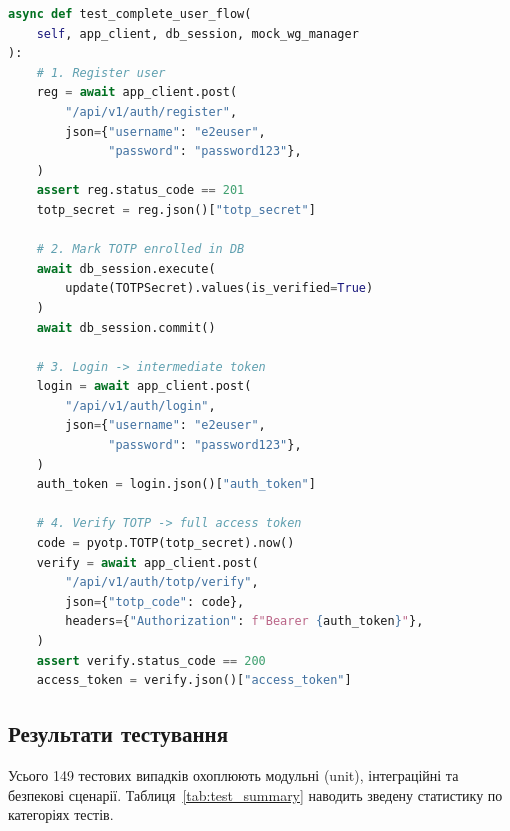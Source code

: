 \begin{lstlisting}[style=mystyle, language=Python,
  caption={Фрагмент наскрізного інтеграційного тесту},
  label={lst:e2e_test}]
async def test_complete_user_flow(
    self, app_client, db_session, mock_wg_manager
):
    # 1. Register user
    reg = await app_client.post(
        "/api/v1/auth/register",
        json={"username": "e2euser",
              "password": "password123"},
    )
    assert reg.status_code == 201
    totp_secret = reg.json()["totp_secret"]

    # 2. Mark TOTP enrolled in DB
    await db_session.execute(
        update(TOTPSecret).values(is_verified=True)
    )
    await db_session.commit()

    # 3. Login -> intermediate token
    login = await app_client.post(
        "/api/v1/auth/login",
        json={"username": "e2euser",
              "password": "password123"},
    )
    auth_token = login.json()["auth_token"]

    # 4. Verify TOTP -> full access token
    code = pyotp.TOTP(totp_secret).now()
    verify = await app_client.post(
        "/api/v1/auth/totp/verify",
        json={"totp_code": code},
        headers={"Authorization": f"Bearer {auth_token}"},
    )
    assert verify.status_code == 200
    access_token = verify.json()["access_token"]
\end{lstlisting}

\subsection{Результати тестування}

Усього 149 тестових випадків охоплюють модульні (unit), інтеграційні
та безпекові сценарії. Таблиця~\ref{tab:test_summary}
наводить зведену статистику по категоріях тестів.

